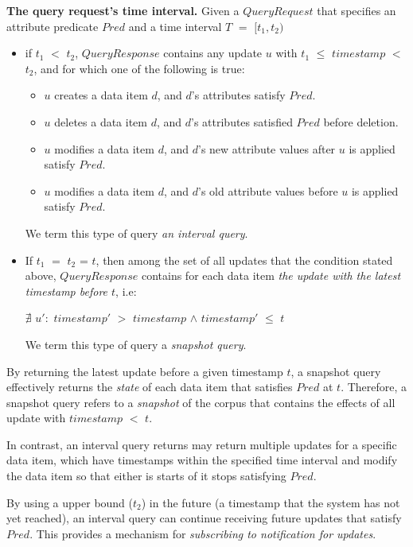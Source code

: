 \medskip
\noindent
\textbf{The query request's time interval.}
Given a $QueryRequest$ that specifies an attribute predicate $Pred$ and a time interval $T$ $=$ $[t_1, t_2)$
\begin{itemize}

  \item if $t_1$ $<$ $t_2$,
  $QueryResponse$ contains any update $u$ with $t_1$ $\leq$ $timestamp$ $<$ $t_2$,
  and for which one of the following is true:
  \begin{itemize}
    \item $u$ creates a data item $d$, and $d$'s attributes satisfy $Pred$.
    \item $u$ deletes a data item $d$, and $d$'s attributes satisfied $Pred$ before deletion.
    \item $u$ modifies a data item $d$, and $d$'s new attribute values after $u$ is applied satisfy $Pred$.
    \item $u$ modifies a data item $d$, and $d$'s old attribute values before $u$ is applied satisfy $Pred$.
  \end{itemize}
  We term this type of query \textit{an interval query}.

  \item If $t_1$ $=$ $t_2$ = $t$,
  then among the set of all updates that the condition stated above,
  $QueryResponse$ contains for each data item \textit{the update with the latest timestamp before $t$}, i.e:

  $\nexists$ $u':$ $timestamp'$ $>$ $timestamp$ $\land$ $timestamp'$ $\leq$ $t$

  We term this type of query a \textit{snapshot query}.

\end{itemize}

By returning the latest update before a given timestamp $t$,
a snapshot query effectively returns the \textit{state} of each data item that satisfies $Pred$ at $t$.
Therefore, a snapshot query refers to a \textit{snapshot} of the corpus that contains the effects of all update with
$timestamp$ $<$ $t$.

In contrast, an interval query returns may return multiple updates for a specific data item,
which have timestamps within the specified time interval and modify the data item so that either is starts of it stops satisfying $Pred$.

By using a upper bound ($t_2$) in the future (a timestamp that the system has not yet reached),
an interval query can continue receiving future updates that satisfy $Pred$.
This provides a mechanism for \textit{subscribing to notification for updates}.


